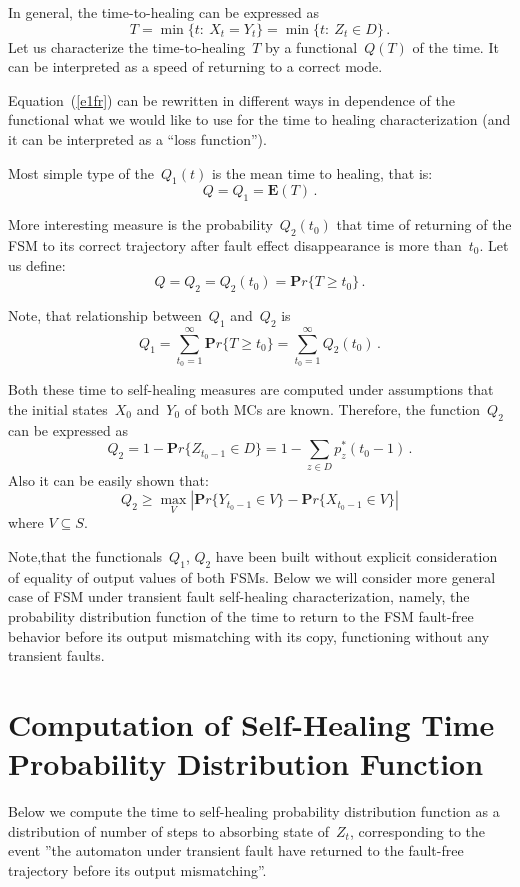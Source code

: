 \begin{multicols}{2}
In general, the time-to-healing can be expressed as
\begin{equation}
T =
\min\{t:\ X_t=Y_t\}=\min\{t:\ Z_t\in D\}\,.   
\label{e1fr}
\end{equation}
Let us characterize the time-to-healing~$T$ by
a functional~$Q(T)$ of the time.
It can be interpreted as a speed of returning to
a correct mode.

Equation~(\ref{e1fr}) can be rewritten in different ways in
dependence of the functional what we would like to
use for the time to healing characterization (and
it can be interpreted as a ``loss function'').

Most simple type of the~$Q_1(t)$ is the mean time
to healing, that is:
$$
Q = Q_1 = {\mathbf E}(T)\,.
$$

More interesting measure is the probability~$Q_2(t_0)$ 
that time of returning of the FSM to its correct
trajectory
after fault effect disappearance  is more than~$t_0$.
Let us define:
$$
Q = Q_2 = Q_2(t_0) = {\mathbf Pr}\{T\ge t_0\}\,.
$$

Note, that relationship between~$Q_1$ and~$Q_2$ is
$$
Q_1 =
\sum_{t_0=1}^\infty {\mathbf Pr}\{T\ge t_0\}
=
\sum_{t_0=1}^\infty Q_2(t_0)\,.
$$

Both these time to self-healing measures are computed
under assumptions that the initial states~$X_0$ and~$Y_0$ of both MCs are known.
Therefore, the function~$Q_2$ can be expressed as
$$
Q_2
=
1 - {\mathbf Pr}\{Z_{t_0-1}\in D\}
=
1 - \sum_{z\in D} p_{z}^*(t_0-1)\,.
$$
Also it can be easily shown   that:
$$
Q_2
\ge
\max\limits_V
\left|{\mathbf Pr}\{Y_{t_0-1}\in V\}
-
{\mathbf Pr}\{X_{t_0-1}\in V\}\right|
$$
where $V\subseteq S$.

Note,that the functionals~$Q_1$, $Q_2$ have been built
without explicit consideration of equality of  output
values of both FSMs.
Below we will consider more general case of FSM under
transient fault self-healing characterization, namely,
the probability distribution function of the time to
return to the FSM fault-free behavior before its output
mismatching with its copy, functioning without any
transient faults.

\section{Computation of   Self-Healing Time Probability
Distribution Function}

Below we compute the time to self-healing probability
distribution function as a distribution of  number
of steps  to absorbing state of~$Z_t$, corresponding
to the event ''the automaton under transient fault
have returned to the fault-free trajectory before
its output mismatching''.


\end{multicols}
